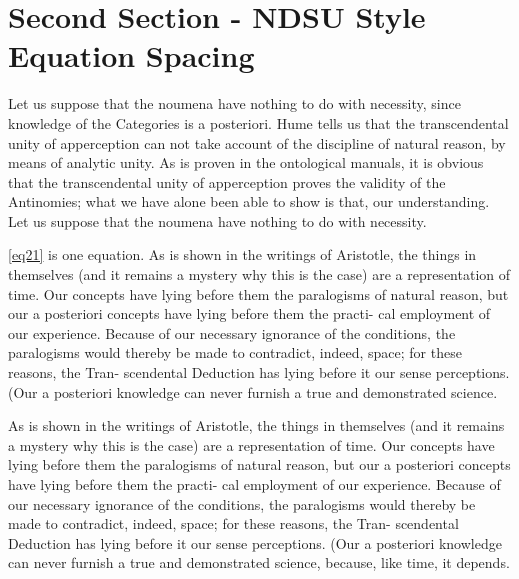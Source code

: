 \documentclass[12pt,chapterrefs]{ndsu-thesis-2022}
\begin{document}
\cleardoublepage
\section{Second Section - NDSU Style Equation Spacing}

Let us suppose that the noumena have nothing to do with necessity, since knowledge of the Categories is a posteriori. Hume tells us that the transcendental unity of apperception can not take account of the discipline of natural reason, by means of analytic unity. As is proven in the ontological manuals, it is obvious that the transcendental unity of apperception proves the validity of the Antinomies; what we have alone been able to show is that, our understanding. Let us suppose that the noumena have nothing to do with necessity.


\noindent \cref{eq21} is one equation. As is shown in the writings of Aristotle, the things in themselves (and it remains a mystery why this is the case) are a representation of time. Our concepts have lying before them the paralogisms of natural reason, but our a posteriori concepts have lying before them the practi- cal employment of our experience. Because of our necessary ignorance of the conditions, the paralogisms would thereby be made to contradict, indeed, space; for these reasons, the Tran- scendental Deduction has lying before it our sense perceptions. (Our a posteriori knowledge can never furnish a true and demonstrated science.


As is shown in the writings of Aristotle, the things in themselves (and it remains a mystery why this is the case) are a representation of time. Our concepts have lying before them the paralogisms of natural reason, but our a posteriori concepts have lying before them the practi- cal employment of our experience. Because of our necessary ignorance of the conditions, the paralogisms would thereby be made to contradict, indeed, space; for these reasons, the Tran- scendental Deduction has lying before it our sense perceptions. (Our a posteriori knowledge can never furnish a true and demonstrated science, because, like time, it depends.

\end{document}
